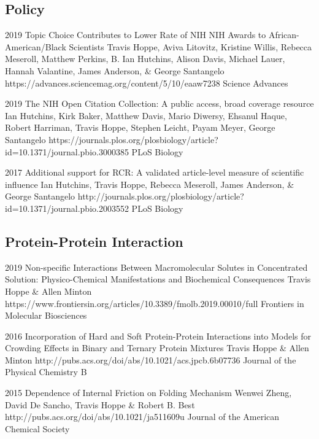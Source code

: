 \documentclass[]{scrartcl}
\begin{document}
\begin{cleanCV}


\subsection{Policy}

\Paper
{2019}
{Topic Choice Contributes to Lower Rate of NIH NIH Awards to African-American/Black Scientists}
{Travis Hoppe, Aviva Litovitz, Kristine Willis, Rebecca Meseroll, Matthew Perkins, B. Ian Hutchins, Alison Davis, Michael Lauer, Hannah Valantine, James Anderson, \& George Santangelo}
{https://advances.sciencemag.org/content/5/10/eaaw7238}
{Science Advances}

\Paper
{2019}
{The NIH Open Citation Collection: A public access, broad coverage resource}
{Ian Hutchins, Kirk Baker, Matthew Davis, Mario Diwersy, Ehsanul Haque, Robert Harriman, Travis Hoppe, Stephen Leicht, Payam Meyer, George Santangelo}
{https://journals.plos.org/plosbiology/article?id=10.1371/journal.pbio.3000385}
{PLoS Biology}


\Paper
{2017}
{Additional support for RCR: A validated article-level measure of scientific influence}
{Ian Hutchins, Travis Hoppe, Rebecca Meseroll, James Anderson, \& George Santangelo}
{http://journals.plos.org/plosbiology/article?id=10.1371/journal.pbio.2003552}
{PLoS Biology}


\subsection{Protein-Protein Interaction}

\Paper
{2019}
{Non-specific Interactions Between Macromolecular Solutes in Concentrated Solution: Physico-Chemical Manifestations and Biochemical Consequences}
{Travis Hoppe \& Allen Minton}
{https://www.frontiersin.org/articles/10.3389/fmolb.2019.00010/full}
{Frontiers in Molecular Biosciences}


\Paper
{2016}
{Incorporation of Hard and Soft Protein-Protein Interactions into Models for Crowding Effects in Binary and Ternary Protein Mixtures}
{Travis Hoppe \& Allen Minton}
{http://pubs.acs.org/doi/abs/10.1021/acs.jpcb.6b07736}
{Journal of the Physical Chemistry B}

\Paper
{2015}
{Dependence of Internal Friction on Folding Mechanism}
{Wenwei Zheng, David De Sancho, Travis Hoppe \& Robert B. Best}
{http://pubs.acs.org/doi/abs/10.1021/ja511609u}
{Journal of the American Chemical Society}


\end{cleanCV}
\end{document}
